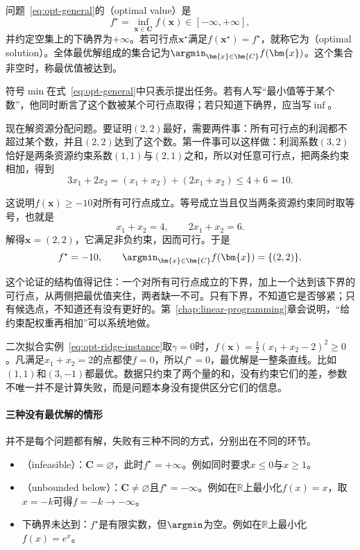 \begin{definition}[最优值与最优解]
\label{def:opt-optimal-value}
问题~\eqref{eq:opt-general}的（optimal value）是
\begin{equation}
 f^\star=\inf_{\bm{x}\in\bm{C}}f(\bm{x})\in[-\infty,+\infty],
 \label{eq:opt-optimal-value}
\end{equation}
并约定空集上的下确界为$+\infty$。若可行点$\bm{x}^\star$满足$f(\bm{x}^\star)=f^\star$，就称它为（optimal solution）。全体最优解组成的集合记为$\argmin_{\bm{x}\in\bm{C}}f(\bm{x})$。这个集合非空时，称最优值被达到。
\end{definition}

符号$\min$在式~\eqref{eq:opt-general}中只表示提出任务。若有人写“最小值等于某个数”，他同时断言了这个数被某个可行点取得；若只知道下确界，应当写$\inf$。

现在解资源分配问题。要证明$(2,2)$最好，需要两件事：所有可行点的利润都不超过某个数，并且$(2,2)$达到了这个数。第一件事可以这样做：利润系数$(3,2)$恰好是两条资源约束系数$(1,1)$与$(2,1)$之和，所以对任意可行点，把两条约束相加，得到
\[
 3x_1+2x_2=(x_1+x_2)+(2x_1+x_2)\leq4+6=10.
\]

这说明$f(\bm{x})\geq-10$对所有可行点成立。等号成立当且仅当两条资源约束同时取等号，也就是
\[
 x_1+x_2=4,\qquad 2x_1+x_2=6.
\]
解得$\bm{x}=(2,2)$，它满足非负约束，因而可行。于是
\[
 f^\star=-10,\qquad \argmin_{\bm{x}\in\bm{C}}f(\bm{x})=\{(2,2)\}.
\]

这个论证的结构值得记住：一个对所有可行点成立的下界，加上一个达到该下界的可行点，从两侧把最优值夹住，两者缺一不可。只有下界，不知道它是否够紧；只有候选点，不知道还有没有更好的。第~\ref{chap:linear-programming}章会说明，“给约束配权重再相加”可以系统地做。

二次拟合实例~\eqref{eq:opt-ridge-instance}取$\gamma=0$时，$f(\bm{x})=\frac12(x_1+x_2-2)^2\geq0$。凡满足$x_1+x_2=2$的点都使$f=0$，所以$f^\star=0$，最优解是一整条直线。比如$(1,1)$和$(3,-1)$都最优。数据只约束了两个量的和，没有约束它们的差，参数不唯一并不是计算失败，而是问题本身没有提供区分它们的信息。

\paragraph{三种没有最优解的情形}
并不是每个问题都有解，失败有三种不同的方式，分别出在不同的环节。

\begin{itemize}
 \item {}（infeasible）：$\bm{C}=\varnothing$，此时$f^\star=+\infty$。例如同时要求$x\leq0$与$x\geq1$。
 \item {}（unbounded below）：$\bm{C}\neq\varnothing$且$f^\star=-\infty$。例如在$\mathbb{R}$上最小化$f(x)=x$，取$x=-k$可得$f=-k\to-\infty$。
 \item 下确界未达到：$f^\star$是有限实数，但$\argmin$为空。例如在$\mathbb{R}$上最小化$f(x)=e^x$。
\end{itemize}

